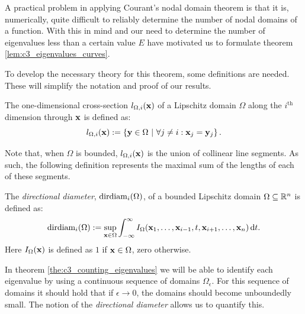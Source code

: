 A practical problem in applying Courant's nodal domain theorem is that it is, numerically, quite difficult to reliably determine the number of nodal domains of a function. With this in mind and our need to determine the number of eigenvalues less than a certain value $E$ have motivated us to formulate theorem \ref{lem:c3_eigenvalues_curves}.

To develop the necessary theory for this theorem, some definitions are needed. These will simplify the notation and proof of our results.
\begin{definition}
  The one-dimensional cross-section $l_{\Omega,i}(\vb{x})$ of a Lipschitz domain $\Omega$ along the $i^\text{th}$ dimension through $\vb{x}$ is defined as:
  $$
    l_{\Omega,i}(\vb{x}) := \left\{\vb{y} \in \Omega \ |\  \forall j \neq i : \vb{x}_j = \vb{y}_j   \right\}\text{.}
  $$
\end{definition}

Note that, when $\Omega$ is bounded, $l_{\Omega,i}(\vb{x})$ is the union of collinear line segments. As such, the following definition represents the maximal sum of the lengths of each of these segments.

\begin{definition}
  The \emph{directional diameter}, $\operatorname{dirdiam}_i(\Omega)$, of a bounded Lipschitz domain $\Omega \subseteq \mathbb{R}^n$ is defined as:
  $$
    \operatorname{dirdiam}_i(\Omega) := \sup_{\vb{x}\in\Omega} \int_{-\infty}^{\infty} I_\Omega(\vb{x}_1, \dots, \vb{x}_{i-1}, t, \vb{x}_{i+1}, \dots, \vb{x}_n) \, \dd t \text{.}
  $$
  Here $I_\Omega(\vb{x})$ is defined as $1$ if $\vb{x} \in \Omega$, zero otherwise.
\end{definition}

In theorem \ref{the:c3_counting_eigenvalues} we will be able to identify each eigenvalue by using a continuous sequence of domains $\Omega_\epsilon$. For this sequence of domains it should hold that if $\epsilon \to 0$, the domains should become unboundedly small. The notion of the \emph{directional diameter} allows us to quantify this.

